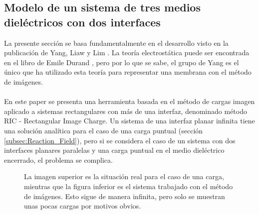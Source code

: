 \documentclass[12pt, twoside, onehalfspace, numbers, spanish]{ezthesis}
\numberwithin{equation}{section}
\begin{document}
\subsection{Modelo de un sistema de tres medios dieléctricos con dos interfaces} \label{subsec:2_Inter_Images}
La presente sección se basa fundamentalmente en el desarrollo visto en la publicación de Yang, Liaw y Lim \cite{Pei-kun}. La teoría electrostática puede ser encontrada en el libro de Emile Durand \cite{Durand}, pero por lo que se sabe, el grupo de Yang es el único que ha utilizado esta teoría para representar una membrana con el método de imágenes.\\\\
En este paper se presenta una herramienta basada en el método de cargas imagen aplicado a sistemas rectangulares con más de una interfaz, denominado método RIC - Rectangular Image Charge. Un sistema de una interfaz planar infinita tiene una solución analítica para el caso de una carga puntual (sección \ref{subsec:Reaction_Field}), pero si se considera el caso de un sistema con dos interfaces planares paralelas y una carga puntual en el medio dieléctrico encerrado, el problema se complica.
\begin{figure}[h]
\centering

\caption{La imagen superior es la situación real para el caso de una carga, mientras que la figura inferior es el sistema trabajado con el método de imágenes. Esto sigue de manera infinita, pero solo se muestran unas pocas cargas por motivos obvios.}
\label{Fig:Infty_Images}
\end{figure}
\end{document}
